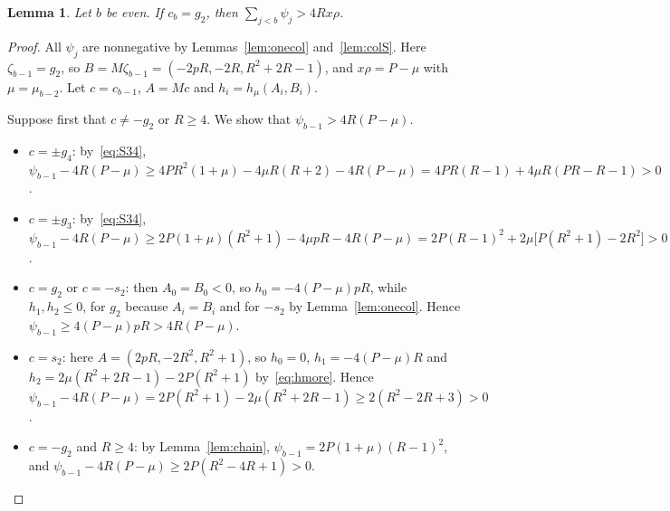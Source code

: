\documentclass[11pt]{article}
\newtheorem{lemma}[theorem]{Lemma}
\theoremstyle{remark}
\begin{document}
\begin{lemma}\label{lem:fd2}
Let $b$ be even. If $c_b=g_2$, then $\sum_{j<b}\psi_j>4Rx\rho$.
\end{lemma}
\begin{proof}
All $\psi_j$ are nonnegative by Lemmas~\ref{lem:onecol} and~\ref{lem:colS}.
Here $\zeta_{b-1}=g_2$, so $B=M\zeta_{b-1}=(-2pR,-2R,R^2+2R-1)$, and
$x\rho=P-\mu$ with $\mu=\mu_{b-2}$. Let $c=c_{b-1}$, $A=Mc$ and
$h_i=h_\mu(A_i,B_i)$.

Suppose first that $c\ne-g_2$ or $R\ge4$. We show that
$\psi_{b-1}>4R(P-\mu)$.
\begin{itemize}
\item $c=\pm g_4$: by~\eqref{eq:S34},
 $\psi_{b-1}-4R(P-\mu)\ge4PR^2(1+\mu)-4\mu R(R+2)-4R(P-\mu)
 =4PR(R-1)+4\mu R(PR-R-1)>0$.
\item $c=\pm g_3$: by~\eqref{eq:S34},
 $\psi_{b-1}-4R(P-\mu)\ge2P(1+\mu)(R^2+1)-4\mu pR-4R(P-\mu)
 =2P(R-1)^2+2\mu\bigl[P(R^2+1)-2R^2\bigr]>0$.
\item $c=g_2$ or $c=-s_2$: then $A_0=B_0<0$, so $h_0=-4(P-\mu)pR$, while
 $h_1,h_2\le0$, for $g_2$ because $A_i=B_i$ and for $-s_2$ by
 Lemma~\ref{lem:onecol}. Hence $\psi_{b-1}\ge4(P-\mu)pR>4R(P-\mu)$.
\item $c=s_2$: here $A=(2pR,-2R^2,R^2+1)$, so $h_0=0$, $h_1=-4(P-\mu)R$ and
 $h_2=2\mu(R^2+2R-1)-2P(R^2+1)$ by~\eqref{eq:hmore}. Hence
 $\psi_{b-1}-4R(P-\mu)=2P(R^2+1)-2\mu(R^2+2R-1)\ge2(R^2-2R+3)>0$.
\item $c=-g_2$ and $R\ge4$: by Lemma~\ref{lem:chain},
 $\psi_{b-1}=2P(1+\mu)(R-1)^2$, and
 $\psi_{b-1}-4R(P-\mu)\ge2P(R^2-4R+1)>0$.
\end{itemize}


\end{proof}
\end{document}
